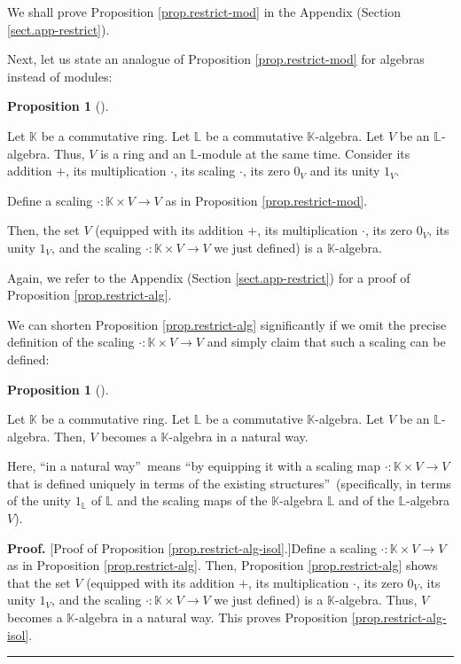 \documentclass[numbers=enddot,12pt,final,onecolumn,notitlepage]{scrartcl}%
\theoremstyle{definition}
\newtheorem{prop}[theo]{Proposition}
\newenvironment{proposition}[1][]
{\begin{prop}[#1]\begin{leftbar}}
{\end{leftbar}\end{prop}}
\newenvironment{proof}[1][Proof]{\noindent\textbf{#1.} }{\ \rule{0.5em}{0.5em}}
\begin{document}
We shall prove Proposition \ref{prop.restrict-mod} in the Appendix (Section
\ref{sect.app-restrict}).

Next, let us state an analogue of Proposition \ref{prop.restrict-mod} for
algebras instead of modules:

\begin{proposition}
\label{prop.restrict-alg}Let $\mathbb{K}$ be a commutative ring. Let
$\mathbb{L}$ be a commutative $\mathbb{K}$-algebra. Let $V$ be an $\mathbb{L}%
$-algebra. Thus, $V$ is a ring and an $\mathbb{L}$-module at the same time.
Consider its addition $+$, its multiplication $\cdot$, its scaling $\cdot$,
its zero $0_{V}$ and its unity $1_{V}$.

Define a scaling $\cdot:\mathbb{K}\times V\rightarrow V$ as in Proposition
\ref{prop.restrict-mod}.

Then, the set $V$ (equipped with its addition $+$, its multiplication $\cdot$,
its zero $0_{V}$, its unity $1_{V}$, and the scaling $\cdot:\mathbb{K}\times
V\rightarrow V$ we just defined) is a $\mathbb{K}$-algebra.
\end{proposition}

Again, we refer to the Appendix (Section \ref{sect.app-restrict}) for a proof
of Proposition \ref{prop.restrict-alg}.

We can shorten Proposition \ref{prop.restrict-alg} significantly if we omit
the precise definition of the scaling $\cdot:\mathbb{K}\times V\rightarrow V$
and simply claim that such a scaling can be defined:

\begin{proposition}
\label{prop.restrict-alg-isol}Let $\mathbb{K}$ be a commutative ring. Let
$\mathbb{L}$ be a commutative $\mathbb{K}$-algebra. Let $V$ be an $\mathbb{L}%
$-algebra. Then, $V$ becomes a $\mathbb{K}$-algebra in a natural way.
\end{proposition}

Here, \textquotedblleft in a natural way\textquotedblright\ means
\textquotedblleft by equipping it with a scaling map $\cdot:\mathbb{K}\times
V\rightarrow V$ that is defined uniquely in terms of the existing
structures\textquotedblright\ (specifically, in terms of the unity
$1_{\mathbb{L}}$ of $\mathbb{L}$ and the scaling maps of the $\mathbb{K}%
$-algebra $\mathbb{L}$ and of the $\mathbb{L}$-algebra $V$).

\begin{proof}
[Proof of Proposition \ref{prop.restrict-alg-isol}.]Define a scaling
$\cdot:\mathbb{K}\times V\rightarrow V$ as in Proposition
\ref{prop.restrict-alg}. Then, Proposition \ref{prop.restrict-alg} shows that
the set $V$ (equipped with its addition $+$, its multiplication $\cdot$, its
zero $0_{V}$, its unity $1_{V}$, and the scaling $\cdot:\mathbb{K}\times
V\rightarrow V$ we just defined) is a $\mathbb{K}$-algebra. Thus, $V$ becomes
a $\mathbb{K}$-algebra in a natural way. This proves Proposition
\ref{prop.restrict-alg-isol}.
\end{proof}
\end{document}

